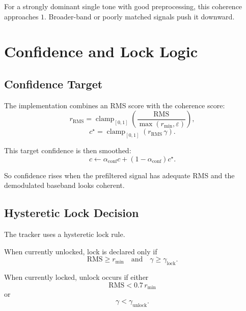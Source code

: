 \documentclass[conference]{IEEEtran}
\begin{document}
For a strongly dominant single tone with good preprocessing, this coherence
approaches \(1\). Broader-band or poorly matched signals push it downward.

\section{Confidence and Lock Logic}\label{sec:lock}

\subsection{Confidence Target}

The implementation combines an RMS score with the coherence score:
\begin{equation}
  r_{\mathrm{RMS}}
  =
  \operatorname{clamp}_{[0,1]}
  \left(
    \frac{\mathrm{RMS}}{\max(r_{\min},\varepsilon)}
  \right),
\end{equation}
\begin{equation}
  c^\star
  =
  \operatorname{clamp}_{[0,1]}(r_{\mathrm{RMS}}\,\gamma).
\end{equation}

This target confidence is then smoothed:
\begin{equation}
  c \leftarrow \alpha_{\mathrm{conf}} c + (1-\alpha_{\mathrm{conf}})c^\star.
\end{equation}

So confidence rises when the prefiltered signal has adequate RMS and the
demodulated baseband looks coherent.

\subsection{Hysteretic Lock Decision}

The tracker uses a hysteretic lock rule.

When currently unlocked, lock is declared only if
\begin{equation}
  \mathrm{RMS} \ge r_{\min}
  \quad\text{and}\quad
  \gamma \ge \gamma_{\mathrm{lock}}.
\end{equation}

When currently locked, unlock occurs if either
\begin{equation}
  \mathrm{RMS} < 0.7\,r_{\min}
\end{equation}
or
\begin{equation}
  \gamma < \gamma_{\mathrm{unlock}}.
\end{equation}
\end{document}
